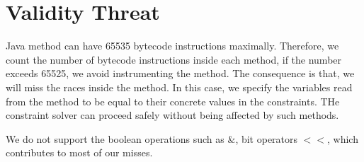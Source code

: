 \section{Validity Threat}
Java method can have 65535 bytecode instructions maximally. Therefore, we count the number of bytecode instructions inside each method, if the number exceeds 65525, we avoid instrumenting the method. The consequence is that, we will miss the races inside the method. In this case, we specify the variables read from the method to be equal to their concrete values in the constraints. THe constraint solver can proceed safely without being affected by such methods.

We do not support the boolean operations such as $\&$, bit operators $<<$, which contributes to most of our misses.



